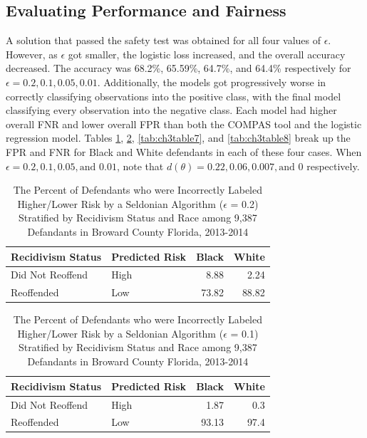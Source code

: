 \documentclass[12pt, twoside]{amherstthesis}
\begin{document}
\hypertarget{evaluating-performance-and-fairness}{%
\subsection{Evaluating Performance and Fairness}\label{evaluating-performance-and-fairness}}

A solution that passed the safety test was obtained for all four values of \(\epsilon\). However, as \(\epsilon\) got smaller, the logistic loss increased, and the overall accuracy decreased. The accuracy was 68.2\%, 65.59\%, 64.7\%, and 64.4\% respectively for \(\epsilon = 0.2, 0.1, 0.05, 0.01\). Additionally, the models got progressively worse in correctly classifying observations into the positive class, with the final model classifying every observation into the negative class. Each model had higher overall FNR and lower overall FPR than both the COMPAS tool and the logistic regression model. Tables \ref{tab:ch3table5}, \ref{tab:ch3table6}, \ref{tab:ch3table7}, and \ref{tab:ch3table8} break up the FPR and FNR for Black and White defendants in each of these four cases. When \(\epsilon = 0.2, 0.1, 0.05, \text{and } 0.01\), note that \(d(\theta) = 0.22, 0.06, 0.007, \text{and } 0\) respectively.
\begin{table}

\caption{\label{tab:ch3table5}The Percent of Defendants who were Incorrectly Labeled Higher/Lower Risk by a Seldonian Algorithm ($\epsilon$ = 0.2) Stratified by Recidivism Status and Race among 9,387 Defandants in Broward County Florida, 2013-2014}
\centering
\begin{tabular}[t]{llrr}
\toprule
Recidivism Status & Predicted Risk & Black & White\\
\midrule
Did Not Reoffend & High & 8.88 & 2.24\\
Reoffended & Low & 73.82 & 88.82\\
\bottomrule
\end{tabular}
\end{table}
\begin{table}

\caption{\label{tab:ch3table6}The Percent of Defendants who were Incorrectly Labeled Higher/Lower Risk by a Seldonian Algorithm ($\epsilon$ = 0.1) Stratified by Recidivism Status and Race among 9,387 Defandants in Broward County Florida, 2013-2014}
\centering
\begin{tabular}[t]{llrr}
\toprule
Recidivism Status & Predicted Risk & Black & White\\
\midrule
Did Not Reoffend & High & 1.87 & 0.3\\
Reoffended & Low & 93.13 & 97.4\\
\bottomrule
\end{tabular}
\end{table}
\end{document}
